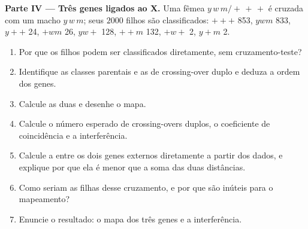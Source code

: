 \begin{problem}
\medskip
\noindent\textbf{Parte IV --- Três genes ligados ao X.}
Uma fêmea $y\,w\,m/+\,+\,+$ é cruzada com um macho $y\,w\,m$; seus
$2000$ filhos são classificados: $+++$ 853, $ywm$ 833, $y++$ 24,
$+wm$ 26, $yw+$ 128, $++m$ 132, $+w+$ 2, $y+m$ 2.
\begin{enumerate}[resume]
  \item Por que os filhos podem ser classificados diretamente, sem
        cruzamento-teste?
  \item Identifique as classes parentais e as de crossing-over duplo e
        deduza a ordem dos genes.
  \item Calcule as duas  e desenhe o mapa.
  \item Calcule o número esperado de crossing-overs duplos, o
        coeficiente de coincidência e a interferência.
  \item Calcule a  entre os dois genes
        externos diretamente a partir dos dados, e explique por que ela
        é menor que a soma das duas distâncias.
  \item Como seriam as filhas desse cruzamento, e por que são inúteis
        para o mapeamento?
  \item Enuncie o resultado: o mapa dos três genes e a interferência.
\end{enumerate}
\end{problem}
